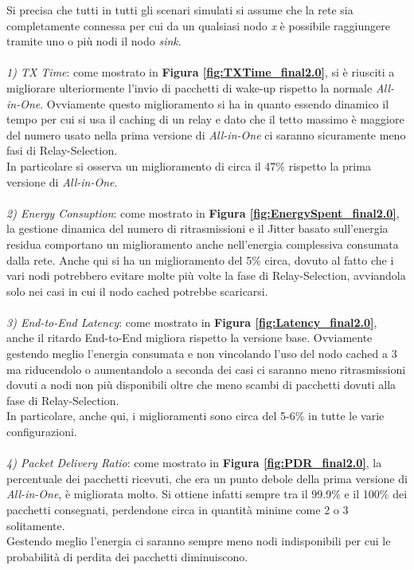 Si precisa che tutti in tutti gli scenari simulati si assume che la rete sia completamente connessa per cui da un qualsiasi nodo \textit{x} è possibile raggiungere tramite uno o più nodi il nodo \textit{sink}.
\\\\
\textit{1) TX Time}: come mostrato in \textbf{Figura \ref{fig:TXTime_final2.0}}, si è riusciti a migliorare ulteriormente l'invio di pacchetti di wake-up rispetto la normale \textit{All-in-One}. Ovviamente questo miglioramento si ha in quanto essendo dinamico il tempo per cui si usa il caching di un relay e dato che il tetto massimo è maggiore del numero usato nella prima versione di \textit{All-in-One} ci saranno sicuramente meno fasi di Relay-Selection.\\
In particolare si osserva un miglioramento di circa il 47\% rispetto la prima versione di \textit{All-in-One}.
\\\\
\textit{2) Energy Consuption}: come mostrato in \textbf{Figura \ref{fig:EnergySpent_final2.0}}, la gestione dinamica del numero di ritrasmissioni e il Jitter basato sull'energia residua comportano un miglioramento anche nell'energia complessiva consumata dalla rete. Anche qui si ha un miglioramento del 5\% circa, dovuto al fatto che i vari nodi potrebbero evitare molte più volte la fase di Relay-Selection, avviandola solo nei casi in cui il nodo cached potrebbe scaricarsi.
\\\\
\textit{3) End-to-End Latency}: come mostrato in \textbf{Figura \ref{fig:Latency_final2.0}}, anche il ritardo End-to-End migliora rispetto la versione base. Ovviamente gestendo meglio l'energia consumata e non vincolando l'uso del nodo cached a 3 ma riducendolo o aumentandolo a seconda dei casi ci saranno meno ritrasmissioni dovuti a nodi non più disponibili oltre che meno scambi di pacchetti dovuti alla fase di Relay-Selection. \\
In particolare, anche qui, i miglioramenti sono circa del 5-6\% in tutte le varie configurazioni.
\\\\
\textit{4) Packet Delivery Ratio}: come mostrato in \textbf{Figura \ref{fig:PDR_final2.0}}, la percentuale dei pacchetti ricevuti, che era un punto debole della prima versione di \textit{All-in-One}, è migliorata molto. Si ottiene infatti sempre tra il 99.9\% e il 100\% dei pacchetti consegnati, perdendone circa in quantità minime come 2 o 3 solitamente. \\
Gestendo meglio l'energia ci saranno sempre meno nodi indisponibili per cui le probabilità di perdita dei pacchetti diminuiscono.

